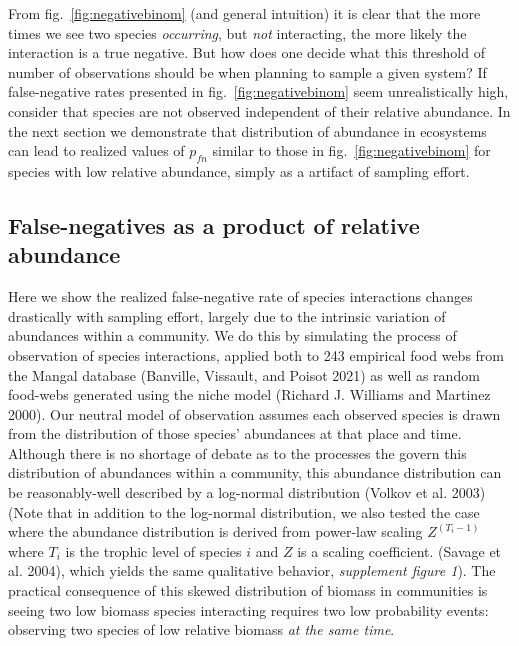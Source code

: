 \documentclass[10pt,oneside]{article}
\begin{document}
From fig.~\ref{fig:negativebinom} (and general intuition) it is clear
that the more times we see two species \emph{occurring}, but \emph{not}
interacting, the more likely the interaction is a true negative. But how
does one decide what this threshold of number of observations should be
when planning to sample a given system? If false-negative rates
presented in fig.~\ref{fig:negativebinom} seem unrealistically high,
consider that species are not observed independent of their relative
abundance. In the next section we demonstrate that distribution of
abundance in ecosystems can lead to realized values of \(p_{fn}\)
similar to those in fig.~\ref{fig:negativebinom} for species with low
relative abundance, simply as a artifact of sampling effort.

\hypertarget{false-negatives-as-a-product-of-relative-abundance}{%
\subsection{False-negatives as a product of relative
abundance}\label{false-negatives-as-a-product-of-relative-abundance}}

Here we show the realized false-negative rate of species interactions
changes drastically with sampling effort, largely due to the intrinsic
variation of abundances within a community. We do this by simulating the
process of observation of species interactions, applied both to 243
empirical food webs from the Mangal database (Banville, Vissault, and
Poisot 2021) as well as random food-webs generated using the niche model
(Richard J. Williams and Martinez 2000). Our neutral model of
observation assumes each observed species is drawn from the distribution
of those species' abundances at that place and time. Although there is
no shortage of debate as to the processes the govern this distribution
of abundances within a community, this abundance distribution can be
reasonably-well described by a log-normal distribution (Volkov et al.
2003) (Note that in addition to the log-normal distribution, we also
tested the case where the abundance distribution is derived from
power-law scaling \(Z^{(T_i-1)}\) where \(T_i\) is the trophic level of
species \(i\) and \(Z\) is a scaling coefficient. (Savage et al. 2004),
which yields the same qualitative behavior, \emph{supplement figure 1}).
The practical consequence of this skewed distribution of biomass in
communities is seeing two low biomass species interacting requires two
low probability events: observing two species of low relative biomass
\emph{at the same time}.
\end{document}
